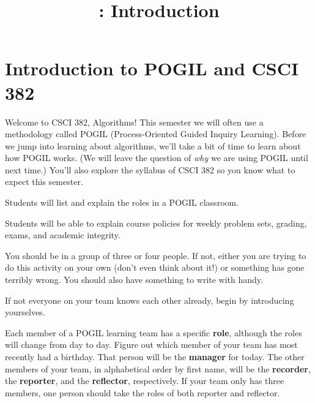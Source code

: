 \documentclass{tufte-handout}
\title{\thecourse: Introduction}
\date{}
\begin{document}
\maketitle

\section{Introduction to POGIL and CSCI 382}

Welcome to CSCI 382, Algorithms!  This semester we will often use a
methodology called POGIL (Process-Oriented Guided Inquiry
Learning). Before we jump into
learning about algorithms, we'll take a bit of time to learn about how
POGIL works. (We will leave the question of \emph{why} we are using
POGIL until next time.)  You'll also explore the syllabus of CSCI 382
so you know what to expect this semester.

\newcommand{\lobjectiveA}{Students will list and explain the roles in a POGIL
  classroom.}
\begin{objective}
  \lobjectiveA
\end{objective}

\newcommand{\lobjectiveB}{Students will be able to explain course
  policies for weekly problem sets, grading, exams, and academic
  integrity.}

\begin{objective}
  \lobjectiveB
\end{objective}

You should be in a group of three or four people.  If not, either you
are trying to do this activity on your own (don't even think about
it!) or something has gone terribly wrong.  You should also have
something to write with handy.

\begin{questions}
\item If not everyone on your team knows each other already, begin by
  introducing yourselves.
\end{questions}

Each member of a POGIL learning team has a specific \textbf{role},
although the roles will change from day to day.  Figure out which
member of your team has most recently had a birthday.  That person
will be the \textbf{manager} for today. The other members of your
team, in alphabetical order by first name, will be the
\textbf{recorder}, the \textbf{reporter}, and the \textbf{reflector},
respectively.  If your team only has three members, one person should
take the roles of both reporter and reflector.
\end{document}
